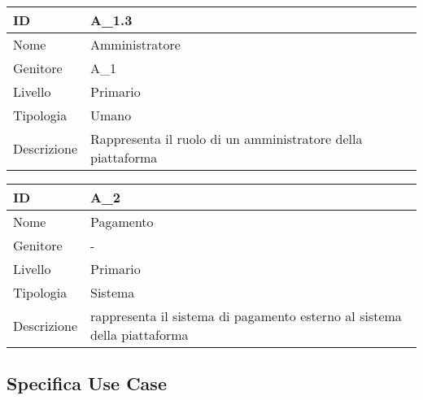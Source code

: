 \begin{center}
\begin{tabular}{ |p{2cm}|p{10cm}|  }
\hline
ID & A\_1.3 \\\hline
Nome & Amministratore\\\hline
Genitore & A\_1\\\hline
Livello &  Primario \\\hline
Tipologia & Umano \\\hline
Descrizione &  Rappresenta il ruolo di un amministratore della piattaforma \\\hline
\end{tabular}
\label{table_attore:1.3}\newline

\begin{tabular}{ |p{2cm}|p{10cm}|  }
\hline
ID & A\_2 \\\hline
Nome & Pagamento\\\hline
Genitore & - \\\hline
Livello &  Primario \\\hline
Tipologia & Sistema \\\hline
Descrizione &  rappresenta il sistema di pagamento esterno al sistema della piattaforma \\\hline
\end{tabular}
\label{table_attore:2}\newline


\subsection{Specifica Use Case}


\end{center}
